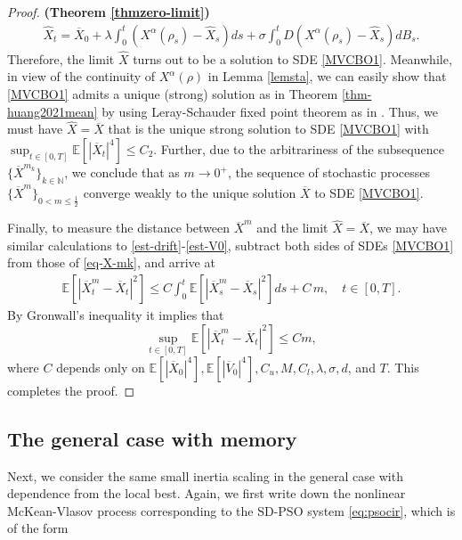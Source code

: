 \documentclass{ims9x6}
\newcommand{\EE}{\mathbb{E}}
\newcommand{\OV}{\overline{V}}
\newcommand{\OX}{\overline{X}}
\begin{document}
\begin{proof}{\textbf{(Theorem \ref{thmzero-limit})}}
	\begin{align*}
	\widehat X_t=\OX_0
	+\lambda\int_0^t(X^{\alpha}(\rho_s)-\widehat X_s)ds +\sigma\int_0^t D(X^{\alpha}(\rho_s)-\widehat X_s)dB_s.
	\end{align*}
	Therefore, the limit $\widehat X$ turns out to be a solution to SDE \eqref{MVCBO1}.
	Meanwhile, in view of the continuity of $X^{\alpha}(\rho)$ in Lemma \ref{lemsta}, we can easily show that \eqref{MVCBO1}  admits a unique (strong) solution as in Theorem \ref{thm-huang2021mean}  by using Leray-Schauder fixed point theorem as in \cite[Theorem 3.1]{carrillo2018analytical}. Thus, we must have $\widehat X = \OX$ that is the unique strong solution to SDE \eqref{MVCBO1} with $\sup_{t\in[0,T]} \EE \left[ |\OX_t|^4\right]\leq C_2$. Further, due to the arbitrariness of the subsequence $\{\OX^{m_k}\}_{k\in\mathbb N}$, we conclude that as $m\rightarrow 0^+$, the sequence of  stochastic processes $\{\OX^m\}_{0< m\leq \frac{1}{2}}$  converge weakly to  the unique solution $\overline X$ to SDE \eqref{MVCBO1}.  
		
	Finally, to measure the distance between $\OX^m$ and the limit $\widehat X=\OX$, we may have similar calculations to \eqref{est-drift}-\eqref{est-V0}, subtract both sides of SDEs \eqref{MVCBO1} from those of \eqref{eq-X-mk}, and arrive at
	\begin{align}
	\EE[|\OX^{m}_t-\OX_t|^2]\leq C\int_0^t\EE[|\OX^{m}_s-\OX_s|^2]ds+ 
	C\, m,\quad t\in[0,T]. \nonumber
	\end{align}
	By Gronwall's inequality it implies that
	\begin{equation}\label{convergence-l2}
	\sup_{t\in[0,T]}\EE[|\OX^{m}_t-\OX_t|^2]\leq Cm ,
	\end{equation}
	where $C$ depends only on $\EE[|\OX_0|^4],\EE[|\OV_0|^4],C_u,M,C_l,\lambda,\sigma,d$, and $T$.   This completes the proof. 
\end{proof}


\subsection{The general case with memory}
Next, we consider the same small inertia scaling in the general case with dependence from the local best. Again, we first write down the 
nonlinear McKean-Vlasov process corresponding to  the SD-PSO system \eqref{eq:psocir}, which is of the form
\end{document}
